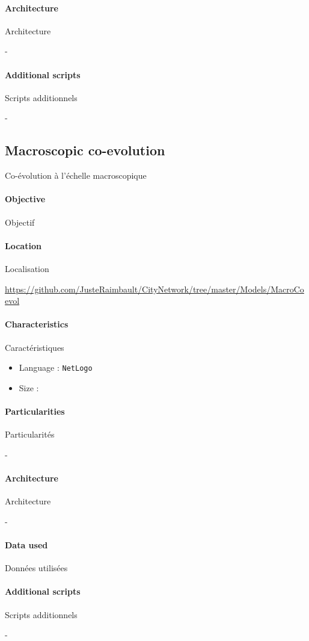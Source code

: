 \paragraph{Architecture}{Architecture}

-

\paragraph{Additional scripts}{Scripts additionnels}

-








\subsection{Macroscopic co-evolution}{Co-évolution à l'échelle macroscopique}

\paragraph{Objective}{Objectif}



\paragraph{Location}{Localisation}

\url{https://github.com/JusteRaimbault/CityNetwork/tree/master/Models/MacroCoevol}

\paragraph{Characteristics}{Caractéristiques}

\begin{itemize}
\item Language : \texttt{NetLogo}
\item Size : 
\end{itemize}


\paragraph{Particularities}{Particularités}

-

\paragraph{Architecture}{Architecture}

-

\paragraph{Data used}{Données utilisées}



\paragraph{Additional scripts}{Scripts additionnels}

-







